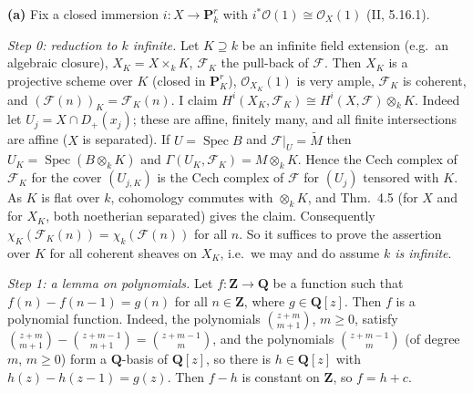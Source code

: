 \documentclass[11pt]{article}
\begin{document}
\pf
\textbf{(a)} Fix a closed immersion $i\colon X\to\mathbf P^r_k$ with $i^*\mathcal O(1)\cong\mathcal O_X(1)$ (II, 5.16.1).

\emph{Step 0: reduction to $k$ infinite.} Let $K\supseteq k$ be an infinite field extension (e.g.\ an algebraic closure), $X_K=X\times_kK$, $\mathcal F_K$ the pull-back of $\mathcal F$. Then $X_K$ is a projective scheme over $K$ (closed in $\mathbf P^r_K$), $\mathcal O_{X_K}(1)$ is very ample, $\mathcal F_K$ is coherent, and $(\mathcal F(n))_K=\mathcal F_K(n)$. I claim $H^i(X_K,\mathcal F_K)\cong H^i(X,\mathcal F)\otimes_kK$. Indeed let $U_j=X\cap D_+(x_j)$; these are affine, finitely many, and all finite intersections are affine ($X$ is separated). If $U=\operatorname{Spec}B$ and $\mathcal F|_U=\tilde M$ then $U_K=\operatorname{Spec}(B\otimes_kK)$ and $\Gamma(U_K,\mathcal F_K)=M\otimes_kK$. Hence the Cech complex of $\mathcal F_K$ for the cover $(U_{j,K})$ is the Cech complex of $\mathcal F$ for $(U_j)$ tensored with $K$. As $K$ is flat over $k$, cohomology commutes with $\otimes_kK$, and Thm.~4.5 (for $X$ and for $X_K$, both noetherian separated) gives the claim. Consequently $\chi_K(\mathcal F_K(n))=\chi_k(\mathcal F(n))$ for all $n$. So it suffices to prove the assertion over $K$ for all coherent sheaves on $X_K$, i.e.\ we may and do assume \emph{$k$ is infinite}.

\emph{Step 1: a lemma on polynomials.} Let $f\colon\mathbf Z\to\mathbf Q$ be a function such that $f(n)-f(n-1)=g(n)$ for all $n\in\mathbf Z$, where $g\in\mathbf Q[z]$. Then $f$ is a polynomial function. Indeed, the polynomials $\binom{z+m}{m+1}$, $m\ge0$, satisfy $\binom{z+m}{m+1}-\binom{z+m-1}{m+1}=\binom{z+m-1}{m}$, and the polynomials $\binom{z+m-1}{m}$ (of degree $m$, $m\ge0$) form a $\mathbf Q$-basis of $\mathbf Q[z]$, so there is $h\in\mathbf Q[z]$ with $h(z)-h(z-1)=g(z)$. Then $f-h$ is constant on $\mathbf Z$, so $f=h+c$.
\end{document}
